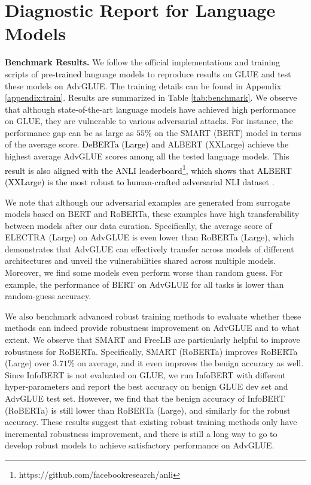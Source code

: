 \documentclass{article}
\newcommand{\method}{AdvGLUE\xspace}
\newcommand{\m}[1]{{\textcolor{black}{{#1}}}}
\begin{document}
\section{Diagnostic Report for Language Models}


\textbf{Benchmark Results.}
We follow the official implementations and training scripts of \m{pre-trained} language models to reproduce results on GLUE and test these models on AdvGLUE. The training details can be found in Appendix \ref{appendix:train}.
Results are summarized in Table \ref{tab:benchmark}. We observe that although state-of-the-art language models have achieved high performance on GLUE, they are vulnerable to various adversarial attacks. For instance, the performance gap can be as large as $55\%$ on the SMART (BERT) model in terms of the average score. 
\m{DeBERTa (Large) and} ALBERT (XXLarge) achieve the highest average \method scores among all the tested language models. \m{This result is also aligned with the ANLI leaderboard\footnote{https://github.com/facebookresearch/anli}, which shows that ALBERT (XXLarge) is the most robust to human-crafted adversarial NLI dataset \citep{anli}. }


We note that although our adversarial examples are generated from surrogate models based on BERT and RoBERTa, these examples have high transferability between models after our data curation. Specifically, the average score of ELECTRA (Large) on \method is even lower than RoBERTa (Large), which demonstrates that \method can effectively transfer across models of different architectures and unveil the vulnerabilities shared across multiple models. 
Moreover, we find  some models even perform worse than random guess. For example, the performance of BERT on \method for all tasks is lower than  random-guess accuracy. 

We also benchmark advanced robust training methods to evaluate whether these methods can indeed provide robustness improvement on \method and to what extent.
We observe that SMART and FreeLB are particularly helpful to improve  robustness for RoBERTa.
Specifically, SMART (RoBERTa) improves RoBERTa (Large) over $3.71\%$ on average, and it even improves the benign accuracy as well. 
Since InfoBERT is not evaluated on GLUE, we run InfoBERT with different hyper-parameters and report the best accuracy on  benign GLUE dev set and \method test set. However, we find that the benign accuracy of InfoBERT (RoBERTa) is still lower than RoBERTa (Large), and similarly for the robust accuracy. 
These results suggest that existing robust training methods only have incremental robustness improvement, and there is still a long way to go to develop robust models to achieve satisfactory performance on \method.
\end{document}
